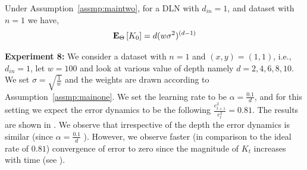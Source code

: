 \begin{corollary}\label{th:dln} Under Assumption~\ref{assmp:maintwo}, for a DLN with $d_{in}=1$, and dataset with $n=1$ we have, \begin{align} \mathbf{E}_{{\Theta}}\left[K_0\right]=d(w\sigma^2)^{(d-1)}\end{align}
\end{corollary}


\textbf{Experiment 8:} We consider a dataset with $n=1$ and $(x,y)=(1,1)$, i.e., $d_{in}=1$, let $w=100$ and look at various value of depth namely  $d=2,4,6,8,10$. We set $\sigma=\sqrt{\frac{1}{w}}$ and the weights are drawn according to Assumption~\ref{assmp:mainone}. We set the learning rate to be $\alpha=\frac{0.1}{d}$, and for this setting we expect the error dynamics to be the following $\frac{e^2_{t+1}}{e^2_t}=0.81$.
The results are shown in . We observe that irrespective of the depth the error dynamics is similar (since $\alpha=\frac{0.1}{d}$ ). However, we observe faster (in comparison to the ideal rate of $0.81$) convergence of error to zero since the magnitude of $K_t$ increases with time (see ).

